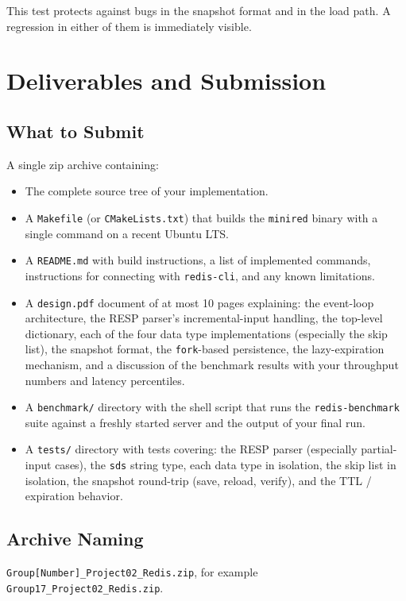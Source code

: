 \documentclass[11pt,a4paper]{article}
\begin{document}
This test protects against bugs in the snapshot format and in the load path. A regression in either of them is immediately visible.

\section{Deliverables and Submission}

\subsection{What to Submit}
A single zip archive containing:

\begin{itemize}
\item The complete source tree of your implementation.
\item A \texttt{Makefile} (or \texttt{CMakeLists.txt}) that builds the \texttt{minired} binary with a single command on a recent Ubuntu LTS.
\item A \texttt{README.md} with build instructions, a list of implemented commands, instructions for connecting with \texttt{redis-cli}, and any known limitations.
\item A \texttt{design.pdf} document of at most 10 pages explaining: the event-loop architecture, the RESP parser's incremental-input handling, the top-level dictionary, each of the four data type implementations (especially the skip list), the snapshot format, the \texttt{fork}-based persistence, the lazy-expiration mechanism, and a discussion of the benchmark results with your throughput numbers and latency percentiles.
\item A \texttt{benchmark/} directory with the shell script that runs the \texttt{redis-benchmark} suite against a freshly started server and the output of your final run.
\item A \texttt{tests/} directory with tests covering: the RESP parser (especially partial-input cases), the \texttt{sds} string type, each data type in isolation, the skip list in isolation, the snapshot round-trip (save, reload, verify), and the TTL / expiration behavior.
\end{itemize}

\subsection{Archive Naming}
\texttt{Group[Number]\_Project02\_Redis.zip}, for example \texttt{Group17\_Project02\_Redis.zip}.
\end{document}
